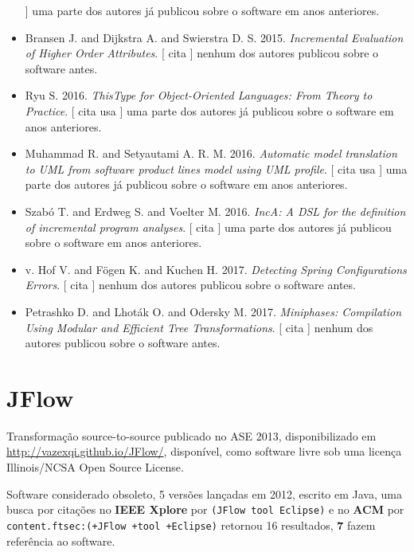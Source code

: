 \begin{itemize}
      ]
uma parte dos autores já publicou sobre o software em anos anteriores.
\item Bransen J. and Dijkstra A. and Swierstra D. S.
      2015.
        \textit{ Incremental Evaluation of Higher Order Attributes}.
      [
          cita
      ]
nenhum dos autores publicou sobre o software antes.
\item Ryu S.
      2016.
        \textit{ ThisType for Object-Oriented Languages: From Theory to Practice}.
      [
          cita
          usa
      ]
uma parte dos autores já publicou sobre o software em anos anteriores.
\item Muhammad R. and Setyautami A. R. M.
      2016.
        \textit{ Automatic model translation to UML from software product lines model using UML profile}.
      [
          cita
          usa
      ]
uma parte dos autores já publicou sobre o software em anos anteriores.
\item Szabó T. and Erdweg S. and Voelter M.
      2016.
        \textit{ IncA: A DSL for the definition of incremental program analyses}.
      [
          cita
      ]
uma parte dos autores já publicou sobre o software em anos anteriores.
\item v. Hof V. and F\"{o}gen K. and Kuchen H.
      2017.
        \textit{ Detecting Spring Configurations Errors}.
      [
          cita
      ]
nenhum dos autores publicou sobre o software antes.
\item Petrashko D. and Lhot\'{a}k O. and Odersky M.
      2017.
        \textit{ Miniphases: Compilation Using Modular and Efficient Tree Transformations}.
      [
          cita
      ]
nenhum dos autores publicou sobre o software antes.
\end{itemize}
\section{JFlow}

Transformação source-to-source
publicado no ASE 2013,
disponibilizado em \url{http://vazexqi.github.io/JFlow/},
disponível,
como software livre
sob uma licença Illinois/NCSA Open Source License.

Software considerado obsoleto,
5 versões lançadas
em 2012,
escrito em Java,
uma busca por citações no {\bf IEEE Xplore} por
\texttt{(JFlow tool Eclipse)}
e no {\bf ACM} por
\texttt{content.ftsec:(+JFlow +tool +Eclipse)}
retornou
16 resultados,
{\bf 7} fazem referência ao software.


